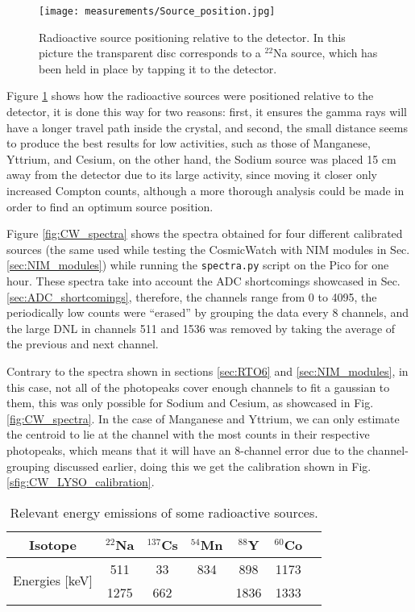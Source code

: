 \begin{figure}[H]
  \centering
  \texttt{[image: measurements/Source\_position.jpg]}
  \caption{\label{fig:source_position}Radioactive source positioning relative to the detector. In this picture the transparent disc corresponds to a $^{22}$Na source, which has been held in place by tapping it to the detector.}
\end{figure}
Figure \ref{fig:source_position} shows how the radioactive sources were positioned relative to the detector, it is done this way for two reasons: first, it ensures the gamma rays will have a longer travel path inside the crystal, and second, the small distance seems to produce the best results for low activities, such as those of Manganese, Yttrium, and Cesium, on the other hand, the Sodium source was placed 15 \unit{\cm} away from the detector due to its large activity, since moving it closer only increased Compton counts, although a more thorough analysis could be made in order to find an optimum source position.

Figure \ref{fig:CW_spectra} shows the spectra obtained for four different calibrated sources (the same used while testing the CosmicWatch with NIM modules in Sec. \ref{sec:NIM_modules}) while running the \texttt{spectra.py} script on the Pico for one hour. These spectra take into account the ADC shortcomings showcased in Sec. \ref{sec:ADC_shortcomings}, therefore, the channels range from 0 to 4095, the periodically low counts were ``erased'' by grouping the data every 8 channels, and the large DNL in channels 511 and 1536 was removed by taking the average of the previous and next channel. 

Contrary to the spectra shown in sections \ref{sec:RTO6} and \ref{sec:NIM_modules}, in this case, not all of the photopeaks cover enough channels to fit a gaussian to them, this was only possible for Sodium and Cesium, as showcased in Fig. \ref{fig:CW_spectra}. In the case of Manganese and Yttrium, we can only estimate the centroid to lie at the channel with the most counts in their respective photopeaks, which means that it will have an 8-channel error due to the channel-grouping discussed earlier, doing this we get the calibration shown in Fig. \ref{sfig:CW_LYSO_calibration}.
\begin{table}[H]
  \caption{Relevant energy emissions of some radioactive sources.}
  \centering
  \begin{tabular}{c c c c c c c}
    \midrule
    Isotope & $^{22}$Na & $^{137}$Cs & $^{54}$Mn & $^{88}$Y & $^{60}$Co \\
    \midrule
    \multirow{2}{*}{Energies [keV]} & 511 & 33 & 834 & 898 & 1173 \\
     & 1275 & 662 &  & 1836 & 1333 \\
    \bottomrule
  \end{tabular}
  \label{tab:energy_emisions}
\end{table}

